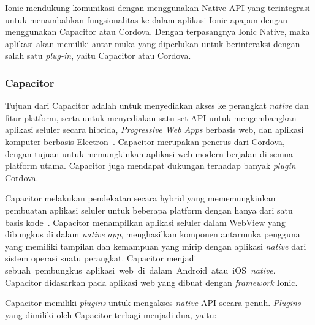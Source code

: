 \newpage

Ionic mendukung komunikasi dengan menggunakan Native API yang terintegrasi untuk menambahkan fungsionalitas ke dalam aplikasi Ionic apapun dengan menggunakan Capacitor atau Cordova. Dengan terpasangnya Ionic Native, maka aplikasi akan memiliki antar muka yang diperlukan untuk berinteraksi dengan salah satu {\it plug-in}, yaitu Capacitor atau Cordova.

\subsubsection{Capacitor}
\label{subsec:capacitor}
Tujuan dari Capacitor adalah untuk menyediakan akses ke perangkat {\it native} dan fitur platform, serta untuk menyediakan satu set API untuk mengembangkan aplikasi seluler secara hibrida, {\it Progressive Web Apps} berbasis web, dan aplikasi komputer berbasis Electron~\cite{tor:19:software}. Capacitor merupakan penerus dari Cordova, dengan tujuan untuk memungkinkan aplikasi web modern berjalan di semua platform utama. Capacitor juga mendapat dukungan terhadap banyak {\it plugin} Cordova.

Capacitor melakukan pendekatan secara hybrid yang mememungkinkan pembuatan aplikasi seluler untuk beberapa platform dengan hanya dari satu basis kode~\cite{huber:21:pwa}. Capacitor menampilkan aplikasi seluler dalam WebView yang dibungkus di dalam \textit{native app}, menghasilkan komponen antarmuka pengguna yang memiliki tampilan dan kemampuan yang mirip dengan aplikasi \textit{native} dari sistem operasi suatu perangkat. Capacitor menjadi sebuah~pembungkus~aplikasi~web~di~dalam~Android~atau~iOS~\textit{native}. Capacitor didasarkan pada aplikasi web yang dibuat dengan \textit{framework} Ionic.

Capacitor memiliki \textit{plugins} untuk mengakses \textit{native} API secara penuh. \textit{Plugins} yang dimiliki oleh Capacitor terbagi menjadi dua, yaitu:

